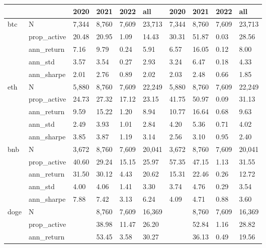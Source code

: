 \begin{tabular}{llllllllll}
\toprule
    &            &   2020 &   2021 &   2022 &     all &  2020  &  2021  &  2022  &    all  \\
\midrule
btc & N &  7,344 &  8,760 &  7,609 &  23,713 &  7,344 &  8,760 &  7,609 &  23,713 \\
    & prop\_active &  20.48 &  20.95 &   1.09 &   14.43 &  30.31 &  51.87 &   0.03 &   28.56 \\
    & ann\_return &   7.16 &   9.79 &   0.24 &    5.91 &   6.57 &  16.05 &   0.12 &    8.00 \\
    & ann\_std &   3.57 &   3.54 &   0.27 &    2.93 &   3.24 &   6.47 &   0.18 &    4.33 \\
    & ann\_sharpe &   2.01 &   2.76 &   0.89 &    2.02 &   2.03 &   2.48 &   0.66 &    1.85 \\
eth & N &  5,880 &  8,760 &  7,609 &  22,249 &  5,880 &  8,760 &  7,609 &  22,249 \\
    & prop\_active &  24.73 &  27.32 &  17.12 &   23.15 &  41.75 &  50.97 &   0.09 &   31.13 \\
    & ann\_return &   9.59 &  15.22 &   1.20 &    8.94 &  10.77 &  16.64 &   0.68 &    9.63 \\
    & ann\_std &   2.49 &   3.93 &   1.01 &    2.84 &   4.20 &   5.36 &   0.71 &    4.02 \\
    & ann\_sharpe &   3.85 &   3.87 &   1.19 &    3.14 &   2.56 &   3.10 &   0.95 &    2.40 \\
bnb & N &  3,672 &  8,760 &  7,609 &  20,041 &  3,672 &  8,760 &  7,609 &  20,041 \\
    & prop\_active &  40.60 &  29.24 &  15.15 &   25.97 &  57.35 &  47.15 &   1.13 &   31.55 \\
    & ann\_return &  31.50 &  30.12 &   4.43 &   20.62 &  15.31 &  22.46 &   0.26 &   12.72 \\
    & ann\_std &   4.00 &   4.06 &   1.41 &    3.30 &   3.74 &   4.76 &   0.29 &    3.54 \\
    & ann\_sharpe &   7.88 &   7.42 &   3.13 &    6.24 &   4.09 &   4.71 &   0.88 &    3.60 \\
doge & N &        &  8,760 &  7,609 &  16,369 &        &  8,760 &  7,609 &  16,369 \\
    & prop\_active &        &  38.98 &  11.47 &   26.20 &        &  52.84 &   1.16 &   28.82 \\
    & ann\_return &        &  53.45 &   3.58 &   30.27 &        &  36.13 &   0.49 &   19.56 \\

\end{tabular}
